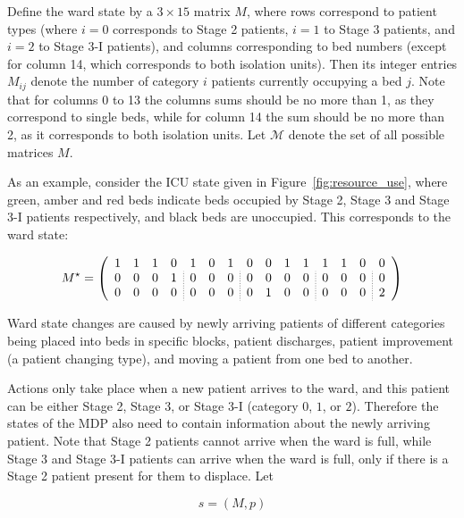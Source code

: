 \documentclass{article}
\begin{document}
Define the ward state by a $3\times15$ matrix $M$, where rows correspond to
patient types (where $i=0$ corresponds to Stage 2 patients, $i=1$ to Stage 3
patients, and $i=2$ to Stage 3-I patients), and columns corresponding to bed
numbers (except for column 14, which corresponds to both isolation units).
Then its integer entries $M_{ij}$ denote the number of category $i$ patients
currently occupying a bed $j$.
Note that for columns 0 to 13 the columns sums should be no more than 1, as they
correspond to single beds, while for column 14 the sum should be no more than 2,
as it corresponds to both isolation units.
Let $\mathcal{M}$ denote the set of all possible matrices $M$.

As an example, consider the ICU state given in Figure~\ref{fig:resource_use},
where green, amber and red beds indicate beds occupied by Stage 2, Stage 3 and
Stage 3-I patients respectively, and black beds are unoccupied.
This corresponds to the ward state:

\begin{equation}\label{eqn:example_M}
M^{\star} = \left(\begin{array}{cccc ;{0.6pt/1.4pt} ccc ;{0.6pt/1.4pt} cccc ;{0.6pt/1.4pt} ccc ;{0.6pt/1.4pt} c}
1 & 1 & 1 & 0 & 1 & 0 & 1 & 0 & 0 & 1 & 1 & 1 & 1 & 0 & 0 \\
0 & 0 & 0 & 1 & 0 & 0 & 0 & 0 & 0 & 0 & 0 & 0 & 0 & 0 & 0 \\
0 & 0 & 0 & 0 & 0 & 0 & 0 & 0 & 1 & 0 & 0 & 0 & 0 & 0 & 2
\end{array}\right)
\end{equation}

Ward state changes are caused by newly arriving patients of different categories
being placed into beds in specific blocks, patient discharges, patient
improvement (a patient changing type), and moving a patient from one bed to
another.

Actions only take place when a new patient arrives to the ward, and this patient
can be either Stage 2, Stage 3, or Stage 3-I (category $0$, $1$, or $2$).
Therefore the states of the MDP also need to contain information about the newly
arriving patient.
Note that Stage 2 patients cannot arrive when the ward is full, while Stage 3
and Stage 3-I patients can arrive when the ward is full, only if there is a
Stage 2 patient present for them to displace.
Let

\begin{equation*}
s = (M, p)
\end{equation*}
\end{document}
